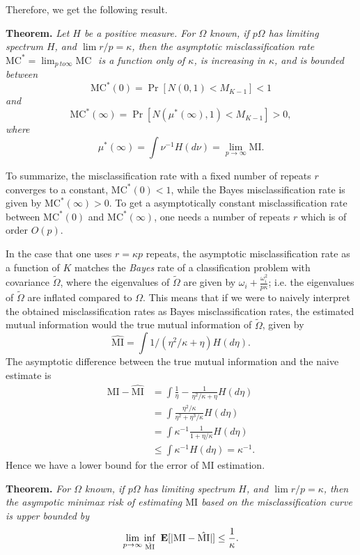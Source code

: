 \documentclass[12pt]{article}
\begin{document}
Therefore, we get the following result.

\textbf{Theorem. }\emph{
Let $H$ be a positive measure.
For $\Omega$ known, if $p\Omega$ has limiting spectrum $H$, and $\lim r/p = \kappa$, then
the asymptotic misclassification rate $\text{MC}^* = \lim_{p\ to \infty} \text{MC }$ is a function only of $\kappa$,
is increasing in $\kappa$,
and is bounded between
\[
\text{MC}^*(0) = \Pr[N(0, 1) < M_{K-1}] < 1
\]
and
\[
\text{MC}^*(\infty) = \Pr[N(\mu^*(\infty), 1) < M_{K-1}] > 0,
\]
where
\[
\mu^*(\infty) = \int \nu^{-1} H(d\nu) = \lim_{p\to \infty} \text{MI}.
\]
}

To summarize, the misclassification rate with a fixed number of
repeats $r$ converges to a constant, $\text{MC}^*(0) < 1$, while the
Bayes misclassification rate is given by $\text{MC}^*(\infty) > 0$.
To get a asymptotically constant misclassification rate between
$\text{MC}^*(0)$ and $\text{MC}^*(\infty)$, one needs a number of
repeats $r$ which is of order $O(p)$.

In the case that one uses $r = \kappa p$ repeats, the asymptotic
misclassification rate as a function of $K$ matches the \emph{Bayes}
rate of a classification problem with covariance $\tilde{\Omega}$,
where the eigenvalues of $\tilde{\Omega}$ are given by $\omega_i
+ \frac{\omega_i^2}{p\kappa}$; i.e. the eigenvalues of
$\tilde{\Omega}$ are inflated compared to $\Omega$.  This means that
if we were to naively interpret the obtained misclassification rates
as Bayes misclassification rates, the estimated mutual information
would the true mutual information of $\tilde{\Omega}$, given by
\[
\hat{\text{MI}} = 
\int 1/(\eta^2/\kappa + \eta) H(d\eta).\]
The asymptotic difference between the true mutual information and the naive estimate is
\begin{align*}
\text{MI} - \hat{\text{MI}} &= \int \frac{1}{\eta} - \frac{1}{\eta^2/\kappa + \eta}H(d\eta) 
\\&= \int \frac{\eta^2/\kappa}{\eta^2 + \eta^3/\kappa} H(d\eta)
\\&= \int \kappa^{-1} \frac{1}{1 + \eta/\kappa} H(d\eta)
\\&\leq \int \kappa^{-1} H(d\eta) =  \kappa^{-1}.
\end{align*}
Hence we have a lower bound for the error of MI estimation.

\textbf{Theorem. }
\emph{
For $\Omega$ known, if $p\Omega$ has limiting spectrum $H$, and $\lim r/p = \kappa$, then
the asympotic minimax risk of estimating $\text{MI}$ based on the misclassification curve is upper bounded by}
\[
\lim_{p \to \infty} \inf_{\hat{\text{MI}}}\ \E[|\text{MI} - \hat{\text{MI}}|] \leq \frac{1}{\kappa}.
\]
\end{document}
